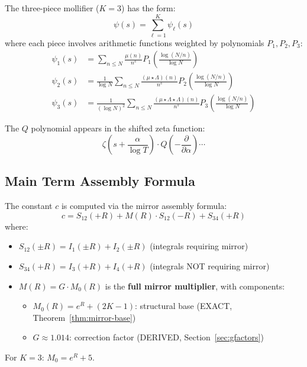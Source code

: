 \documentclass[11pt]{article}
\begin{document}
The three-piece mollifier ($K=3$) has the form:
\begin{equation}
\psi(s) = \sum_{\ell=1}^{K} \psi_\ell(s)
\end{equation}
where each piece involves arithmetic functions weighted by polynomials $P_1, P_2, P_3$:
\begin{align}
\psi_1(s) &= \sum_{n \leq N} \frac{\mu(n)}{n^s} P_1\left(\frac{\log(N/n)}{\log N}\right) \\
\psi_2(s) &= \frac{1}{\log N} \sum_{n \leq N} \frac{(\mu \star \Lambda)(n)}{n^s} P_2\left(\frac{\log(N/n)}{\log N}\right) \\
\psi_3(s) &= \frac{1}{(\log N)^2} \sum_{n \leq N} \frac{(\mu \star \Lambda \star \Lambda)(n)}{n^s} P_3\left(\frac{\log(N/n)}{\log N}\right)
\end{align}

The $Q$ polynomial appears in the shifted zeta function:
\begin{equation}
\zeta\left(s + \frac{\alpha}{\log T}\right) \cdot Q\left(-\frac{\partial}{\partial \alpha}\right) \cdots
\end{equation}

\subsection{Main Term Assembly Formula}

The constant $c$ is computed via the mirror assembly formula:
\begin{equation}
\boxed{c = S_{12}(+R) + M(R) \cdot S_{12}(-R) + S_{34}(+R)}
\end{equation}
where:
\begin{itemize}
\item $S_{12}(\pm R) = I_1(\pm R) + I_2(\pm R)$ (integrals requiring mirror)
\item $S_{34}(+R) = I_3(+R) + I_4(+R)$ (integrals NOT requiring mirror)
\item $M(R) = G \cdot M_0(R)$ is the \textbf{full mirror multiplier}, with components:
  \begin{itemize}
  \item $M_0(R) = e^R + (2K-1)$: structural base (EXACT, Theorem~\ref{thm:mirror-base})
  \item $G \approx 1.014$: correction factor (DERIVED, Section~\ref{sec:gfactors})
  \end{itemize}
\end{itemize}

For $K=3$: $M_0 = e^R + 5$.
\end{document}
